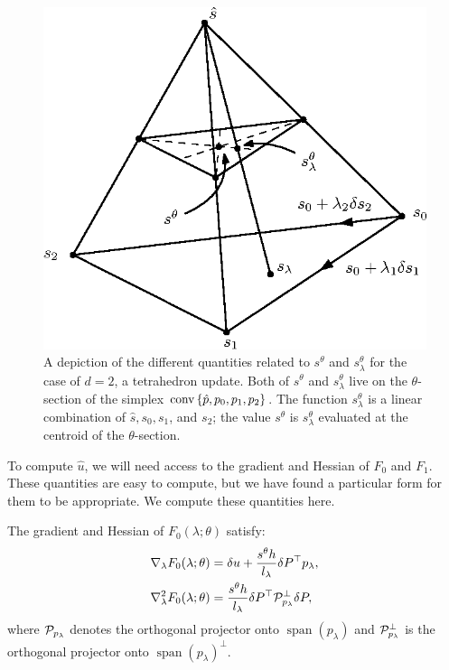 \documentclass[eikonal.tex]{subfiles}
\begin{document}
\begin{figure}
  \centering
  \includegraphics{slowness-tetra.eps}
  \caption{A depiction of the different quantities related to
    $s^{\theta}$ and $s^{\theta}_\lambda$ for the case of $d = 2$, a
    tetrahedron update. Both of $s^\theta$ and $s^\theta_\lambda$ live
    on the $\theta$-section of the simplex
    $\operatorname{conv} \left\{\hat{p}, p_0, p_1, p_2\right\}$. The function
    $s^\theta_\lambda$ is a linear combination of $\hat{s}, s_0, s_1$,
    and $s_2$; the value $s^\theta$ is $s^\theta_\lambda$ evaluated at
    the centroid of the $\theta$-section.}
\end{figure}

To compute $\hat{u}$, we will need access to the gradient and Hessian
of $F_0$ and $F_1$. These quantities are easy to compute, but we have
found a particular form for them to be appropriate. We compute these
quantities here.

\begin{lemma}\label{prop:F0-grad-and-Hess}
  The gradient and Hessian of $F_0(\lambda; \theta)$ satisfy:
  \begin{align}
    \nabla_\lambda F_0(\lambda; \theta) &= \delta u + \frac{s^{\theta} h}{l_\lambda} \delta P^\top p_\lambda, \\
    \nabla^2_\lambda F_0(\lambda; \theta) &= \frac{s^{\theta} h}{l_\lambda} \delta P^\top \mathcal{P}^\perp_{p_\lambda} \delta P,
  \end{align}
  where $\mathcal{P}_{p_\lambda}$ denotes the orthogonal projector onto
  $\operatorname{span}(p_\lambda)$ and $\mathcal{P}_{p_\lambda}^\perp$ is
  the orthogonal projector onto
  $\operatorname{span}(p_\lambda)^\perp$.
\end{lemma}
\end{document}
